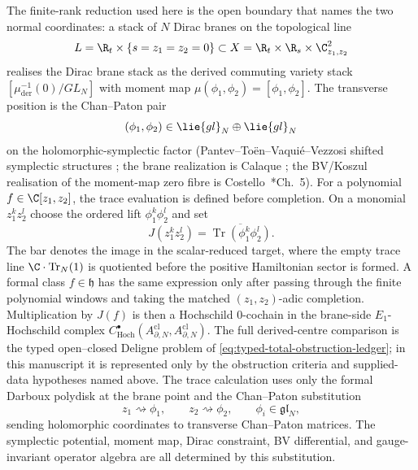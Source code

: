 \documentclass[11pt]{memoir}
\begin{document}
The finite-rank reduction used here is the open boundary that names the
two normal coordinates: a stack of
\(N\) Dirac branes on the topological line
\[
  L=\R_t\times\{s=z_1=z_2=0\}
  \subset
  X=\R_t\times\R_s\times\C^2_{z_1,z_2}
\]
realises the Dirac brane stack as the derived commuting variety stack
\([\mu^{-1}_{\mathrm{der}}(0)/GL_N]\) with moment map
\(\mu(\phi_1,\phi_2)=[\phi_1,\phi_2]\).  The transverse position is the
Chan--Paton pair
\[
  (\phi_1,\phi_2)\in\lie{gl}_N\oplus\lie{gl}_N
\]
on the holomorphic-symplectic factor
(Pantev--To\"en--Vaqui\'e--Vezzosi shifted symplectic structures
\cite{ptvv-shifted-symplectic}; the brane realization is
Calaque \cite{calaque-derived-branes}; the BV/Koszul realisation of
the moment-map zero fibre is
Costello~\cite{costello-renormalization}*{Ch.~5}).
For a polynomial \(f\in\C[z_1,z_2]\), the trace evaluation is defined
before completion.  On a monomial \(z_1^kz_2^l\) choose the ordered
lift \(\phi_1^k\phi_2^l\) and set
\[
  J(z_1^kz_2^l)
  =
  \overline{\operatorname{Tr}(\phi_1^k\phi_2^l)}.
\]
The bar denotes the image in the scalar-reduced target, where the empty
trace line \(\C\cdot\operatorname{Tr}_N(1)\) is quotiented before the
positive Hamiltonian sector is formed.  A formal class \(f\in\mathfrak h\) has the same
expression only after passing through the finite polynomial windows and
taking the matched \((z_1,z_2)\)-adic completion.  Multiplication by
\(J(f)\) is then a Hochschild \(0\)-cochain in the brane-side
\(E_1\)-Hochschild complex
\(C^\bullet_{\mathrm{Hoch}}(A^{\mathrm{cl}}_{\partial,N},A^{\mathrm{cl}}_{\partial,N})\).
The full derived-centre comparison is the typed open--closed Deligne
problem of \eqref{eq:typed-total-obstruction-ledger}; in this
manuscript it is represented only by the obstruction criteria and
supplied-data hypotheses named above.  The trace calculation
uses only the formal Darboux polydisk at the brane point and the
Chan--Paton substitution
\[
  z_1\rightsquigarrow\phi_1,\qquad z_2\rightsquigarrow\phi_2,\qquad
  \phi_i\in\mathfrak{gl}_N,
\]
sending holomorphic coordinates to transverse Chan--Paton matrices.
The symplectic potential, moment map, Dirac constraint, BV
differential, and gauge-invariant operator algebra are all determined
by this substitution.
\end{document}
